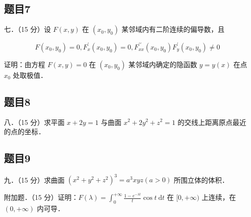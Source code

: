 \documentclass{article}
\begin{document}
\subsection{题目7}
七．（15 分）设 \(F(x, y)\) 在 \(\left(x_{0}, y_{0}\right)\) 某邻域内有二阶连续的偏导数，且

\[
F\left(x_{0}, y_{0}\right)=0, F_{x}^{\prime}\left(x_{0}, y_{0}\right)=0, F_{x x}^{\prime \prime}\left(x_{0}, y_{0}\right) F_{y}^{\prime}\left(x_{0}, y_{0}\right) \neq 0
\]

证明：由方程 \(F(x, y)=0\) 在 \(\left(x_{0}, y_{0}\right)\) 某邻域内确定的隐函数 \(y=y(x)\) 在点 \(x_{0}\) 处取极值．

\subsection{题目8}
八．（15 分）求平面 \(x+2 y=1\) 与曲面 \(x^{2}+2 y^{2}+z^{2}=1\) 的交线上距离原点最近的点的坐标．

\subsection{题目9}
九．（15 分）求曲面 \(\left(x^{2}+y^{2}+z^{2}\right)^{3}=a^{3} x y z(a>0)\) 所围立体的体积．

附加题．（15 分）证明：\(F(\lambda)=\int_{0}^{+\infty} \frac{1-e^{-\lambda t}}{t} \cos t \mathrm{~d} t\) 在 \([0,+\infty)\) 上连续，在 \((0,+\infty)\) 内可导．
\end{document}
